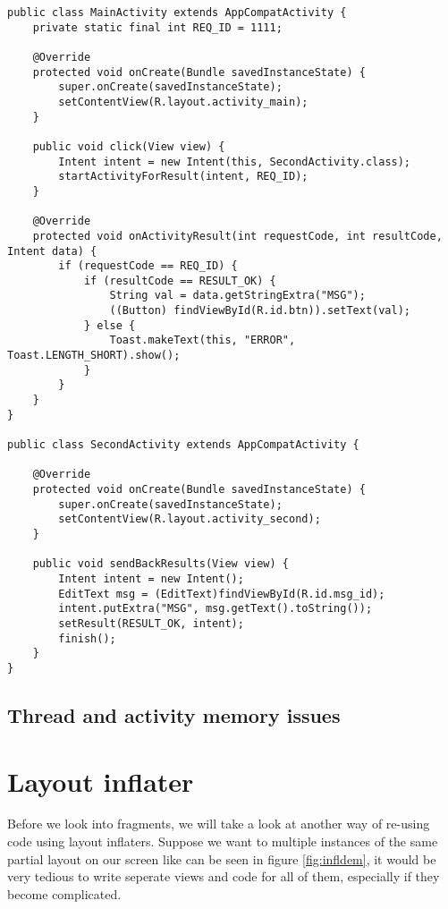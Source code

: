 \begin{lstlisting}[style=A_Java, caption={Start activity for result}, label={listing:javaforres}]
public class MainActivity extends AppCompatActivity {
    private static final int REQ_ID = 1111;

    @Override
    protected void onCreate(Bundle savedInstanceState) {
        super.onCreate(savedInstanceState);
        setContentView(R.layout.activity_main);
    }

    public void click(View view) {
        Intent intent = new Intent(this, SecondActivity.class);
        startActivityForResult(intent, REQ_ID);
    }

    @Override
    protected void onActivityResult(int requestCode, int resultCode, Intent data) {
        if (requestCode == REQ_ID) {
            if (resultCode == RESULT_OK) {
                String val = data.getStringExtra("MSG");
                ((Button) findViewById(R.id.btn)).setText(val);
            } else {
                Toast.makeText(this, "ERROR", Toast.LENGTH_SHORT).show();
            }
        }
    }
}

public class SecondActivity extends AppCompatActivity {

    @Override
    protected void onCreate(Bundle savedInstanceState) {
        super.onCreate(savedInstanceState);
        setContentView(R.layout.activity_second);
    }

    public void sendBackResults(View view) {
        Intent intent = new Intent();
        EditText msg = (EditText)findViewById(R.id.msg_id);
        intent.putExtra("MSG", msg.getText().toString());
        setResult(RESULT_OK, intent);
        finish();
    }
}
\end{lstlisting}

\subsection{Thread and activity memory issues}

\section{Layout inflater}
Before we look into fragments, we will take a look at another way of re-using code using layout inflaters. Suppose we want to multiple instances of the same partial layout on our screen like can be seen in figure \ref{fig:infldem}, it would be very tedious to write seperate views and code for all of them, especially if they become complicated. 


